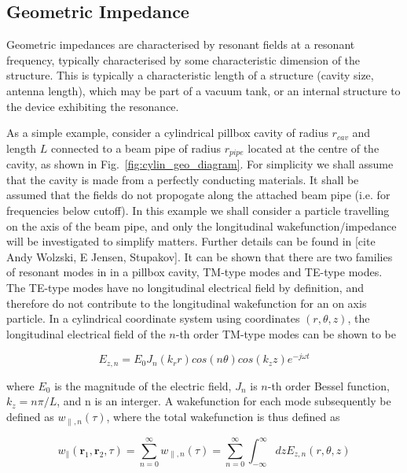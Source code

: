 \subsection{Geometric Impedance}
\label{sec:imp_geo_imp}

Geometric impedances are characterised by resonant fields at a resonant frequency, typically characterised by some characteristic dimension of the structure. This is typically a characteristic length of a structure (cavity size, antenna length), which may be part of a vacuum tank, or an internal structure to the device exhibiting the resonance. 

As a simple example, consider a cylindrical pillbox cavity of radius $r_{cav}$ and length $L$ connected to a beam pipe of radius $r_{pipe}$ located at the centre of the cavity, as shown in Fig.~\ref{fig:cylin_geo_diagram}. For simplicity we shall assume that the cavity is made from a perfectly conducting materials. It shall be assumed that the fields do not propogate along the attached beam pipe (i.e. for frequencies below cutoff). In this example we shall consider a particle travelling on the axis of the beam pipe, and only the longitudinal wakefunction/impedance will be investigated to simplify matters. Further details can be found in [cite Andy Wolzski, E Jensen, Stupakov]. It can be shown that there are two families of resonant modes in in a pillbox cavity, TM-type modes and TE-type modes. The TE-type modes have no longitudinal electrical field by definition, and therefore do not contribute to the longitudinal wakefunction for an on axis particle. In a cylindrical coordinate system using coordinates $(r, \theta, z)$, the longitudinal electrical field of the $n$-th order TM-type modes can be shown to be

\begin{equation}
E_{z,n} = E_{0}J_{n}\left( k_{r} r \right) cos \left( n \theta \right) cos \left( k_{z} z \right) e^{-j \omega t}
\end{equation}

where $E_{0}$ is the magnitude of the electric field, $J_{n}$ is $n$-th order Bessel function, $k_{z}=n\pi{}/L$, and n is an interger. A wakefunction for each mode subsequently be defined as $w_{\parallel ,n}\left( \tau \right)$, where the total wakefunction is thus defined as

\begin{equation}
w_{\parallel} \left( \mathbf{r}_{1}, \mathbf{r}_{2}, \tau \right) =  \displaystyle\sum\limits_{n = 0}^{\infty} w_{\parallel ,n} \left( \tau \right) = \displaystyle\sum\limits_{n = 0}^{\infty} \int^{\infty}_{-\infty} dz E_{z,n} \left( r, \theta , z \right)
\end{equation}

